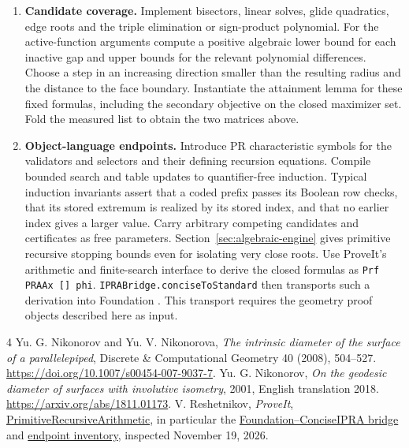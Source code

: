 \documentclass[10pt,letterpaper]{article}
\begin{document}
\begin{enumerate}
then \eqref{eq:gap}.
\item \textbf{Candidate coverage.} Implement bisectors, linear
solves, glide quadratics, edge roots and the triple elimination or
sign-product polynomial. For the active-function arguments compute
a positive algebraic lower bound for each inactive gap and upper
bounds for the relevant polynomial differences. Choose a step in
an increasing direction smaller than the resulting radius and the
distance to the face boundary. Instantiate the attainment lemma for
these fixed formulas, including the secondary objective on the closed
maximizer set. Fold the measured list to obtain the two matrices above.
\item \textbf{Object-language endpoints.} Introduce PR characteristic
symbols for the validators and selectors and their defining recursion
equations. Compile bounded search and table updates to quantifier-free
induction. Typical induction invariants assert that a coded prefix
passes its Boolean row checks, that its stored extremum is realized
by its stored index, and that no earlier index gives a larger value.
Carry arbitrary competing candidates and certificates as free
parameters. Section~\ref{sec:algebraic-engine} gives primitive
recursive stopping bounds even for isolating very close roots.
Use ProveIt's arithmetic and finite-search interface to derive the
closed formulas as \texttt{Prf PRAAx [] phi}.
\texttt{IPRABridge.conciseToStandard} then transports such a
derivation into Foundation \cite{proveit}. This transport requires
the geometry proof objects described here as input.
\end{enumerate}


\begin{thebibliography}{4}
 Yu. G. Nikonorov and Yu. V. Nikonorova,
\emph{The intrinsic diameter of the surface of a parallelepiped},
Discrete \& Computational Geometry 40 (2008), 504--527.
\url{https://doi.org/10.1007/s00454-007-9037-7}.
 Yu. G. Nikonorov,
\emph{On the geodesic diameter of surfaces with involutive isometry},
2001, English translation 2018. \url{https://arxiv.org/abs/1811.01173}.
 V. Reshetnikov, \emph{ProveIt},
\href{https://github.com/VladimirReshetnikov/ProveIt/tree/23663da139ea39aa1c3f92886bdd847d79fdc5ff/Logic/PrimitiveRecursiveArithmetic}{PrimitiveRecursiveArithmetic},
in particular the
\href{https://github.com/VladimirReshetnikov/ProveIt/blob/23663da139ea39aa1c3f92886bdd847d79fdc5ff/Logic/PrimitiveRecursiveArithmetic/Bridge/README.md}{Foundation--ConciseIPRA bridge}
and
\href{https://github.com/VladimirReshetnikov/ProveIt/blob/23663da139ea39aa1c3f92886bdd847d79fdc5ff/Logic/PrimitiveRecursiveArithmetic/ENDPOINTS.md}{endpoint inventory},
inspected November 19, 2026.
\end{thebibliography}
\end{document}

